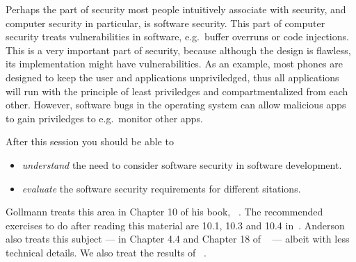 Perhaps the part of security most people intuitively associate with security, 
and computer security in particular, is software security.
This part of computer security treats vulnerabilities in software, e.g.\ buffer 
overruns or code injections.
This is a very important part of security, because although the design is 
flawless, its implementation might have vulnerabilities.
As an example, most phones are designed to keep the user and applications 
unpriviledged, thus all applications will run with the principle of least 
priviledges and compartmentalized from each other.
However, software bugs in the operating system can allow malicious apps to gain
priviledges to e.g.\ monitor other apps.

After this session you should be able to
\begin{itemize}
  \item \emph{understand} the need to consider software security in software 
    development.
  \item \emph{evaluate} the software security requirements for different 
    sitations.
\end{itemize}

Gollmann treats this area in Chapter 10 of his book, 
~\cite{Gollmann2011cs}.
The recommended exercises to do after reading this material are 10.1, 10.3 and 
10.4 in~\cite{Gollmann2011cs}.
Anderson also treats this subject --- in Chapter 4.4 and Chapter 18 of 
~\cite{Anderson2008sea} --- albeit with less 
technical details.
We also treat the results of ~\cite{BSIMMFindings}.

